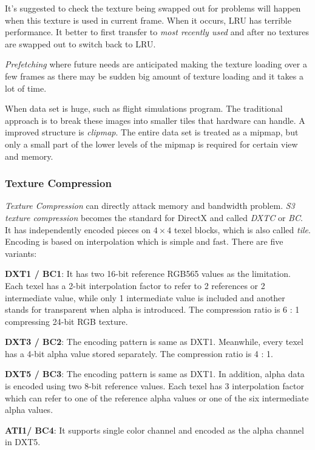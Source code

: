 \documentclass[10pt, a4paper]{article}
\begin{document}
     It's suggested to check the texture being swapped out for problems will happen when this texture is used in current frame. When it occurs, LRU has terrible performance. It better to first transfer to \emph{most recently used} and after no textures are swapped out to switch back to LRU. 

     \emph{Prefetching} where future needs are anticipated making the texture loading over a few frames as there may be sudden big amount of texture loading and it takes a lot of time. 

     When data set is huge, such as flight simulations program. The traditional approach is to break these images into smaller tiles that hardware can handle. A improved structure is \emph{clipmap}. The entire data set is treated as a mipmap, but only a small part of the lower levels of the mipmap is required for certain view and memory. 

\subsubsection{Texture Compression}
    \emph{Texture Compression} can directly attack memory and bandwidth problem. \emph{S3 texture compression} becomes the standard for DirectX and called \emph{DXTC} or \emph{BC}. It has independently encoded pieces on $4 \times 4$ texel blocks, which is also called \emph{tile}. Encoding is based on interpolation which is simple and fast. There are five variants: 
    
    \quad \textbf{DXT1 / BC1}: It has two 16-bit reference RGB565 values as the limitation. Each texel has a 2-bit interpolation factor to refer to 2 references or 2 intermediate value, while only 1 intermediate value is included and another stands for transparent when alpha is introduced. The compression ratio is 6 : 1 compressing 24-bit RGB texture. 

    \quad \textbf{DXT3 / BC2}: The encoding pattern is same as DXT1. Meanwhile, every texel has a 4-bit alpha value stored separately. The compression ratio is 4 : 1. 

    \quad \textbf{DXT5 / BC3}: The encoding pattern is same as DXT1. In addition, alpha data is encoded using two 8-bit reference values. Each texel has 3 interpolation factor which can refer to one of the reference alpha values or one of the six intermediate alpha values. 

    \quad \textbf{ATI1/ BC4}:  It supports single color channel and encoded as the alpha channel in DXT5.
\end{document}
